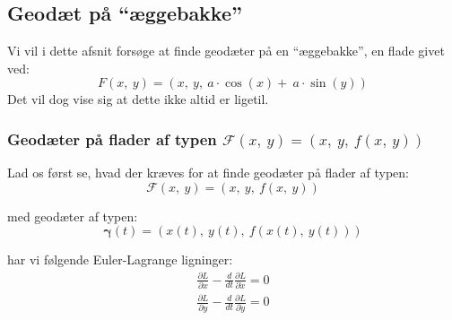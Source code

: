 \newcommand\ddiff[1]{\ddot{#1}}
\newcommand\diff[1]{\dot{#1}}

\subsection{ Geodæt på ``æggebakke'' }
Vi vil i dette afsnit forsøge at finde geodæter på en ``æggebakke'',
en flade givet ved:
\begin{equation}\label{eq:aeggebakke}
F(x,~y) = (x,~y,~a \cdot \cos(x)+~a \cdot \sin(y))
\end{equation}
Det vil dog vise sig at dette ikke altid er ligetil.

\subsubsection{Geodæter på flader af typen \(\mathscr{F}(x,~y) = (x,~y,~f(x,~y))\)}
Lad os først se, hvad der kræves for at finde geodæter på flader af typen:
\begin{equation*}
\mathscr{F}(x,~y) = (x,~y,~f(x,~y))
\end{equation*}

med geodæter af typen:
\begin{equation} \label{eq:geodPlanFlade}
\pmb{\gamma}(t) = (x(t),~y(t),~f(x(t),~y(t)))
\end{equation}

har vi følgende Euler-Lagrange ligninger:
\begin{equation*}
\begin{gathered}
\frac{\partial L}{\partial x} - \frac{d}{dt}\frac{\partial L}{\partial \diff{x}} = 0\\
\frac{\partial L}{\partial y} - \frac{d}{dt}\frac{\partial L}{\partial \diff{y}} = 0
\end{gathered}
\end{equation*}

